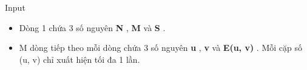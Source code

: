 Input
\begin{itemize}
	\item Dòng 1 chứa 3 số nguyên \textbf{ N } , \textbf{ M } và \textbf{ S } .
	\item M dòng tiếp theo mỗi dòng chứa 3 số nguyên \textbf{ u } , \textbf{ v } và \textbf{ E(u, v) } . Mỗi cặp số (u, v) chỉ xuất hiện tối đa 1 lần.
\end{itemize}